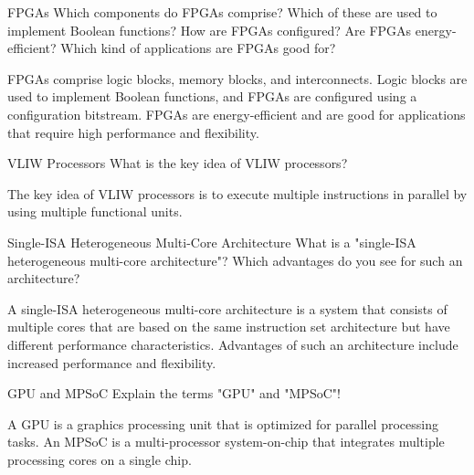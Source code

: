\documentclass{article}
\begin{document}
\begin{exercise}{FPGAs}
  Which components do FPGAs comprise? Which of these are used to implement Boolean functions? How are FPGAs configured? Are FPGAs energy-efficient? Which kind of applications are FPGAs good for?

  \begin{solution}
    FPGAs comprise logic blocks, memory blocks, and interconnects. Logic blocks are used to implement Boolean functions, and FPGAs are configured using a configuration bitstream. FPGAs are energy-efficient and are good for applications that require high performance and flexibility.
  \end{solution}
\end{exercise}

\begin{exercise}{VLIW Processors}
  What is the key idea of VLIW processors?

  \begin{solution}
    The key idea of VLIW processors is to execute multiple instructions in parallel by using multiple functional units.
  \end{solution}
\end{exercise}

\begin{exercise}{Single-ISA Heterogeneous Multi-Core Architecture}
  What is a "single-ISA heterogeneous multi-core architecture"? Which advantages do you see for such an architecture?

  \begin{solution}
    A single-ISA heterogeneous multi-core architecture is a system that consists of multiple cores that are based on the same instruction set architecture but have different performance characteristics. Advantages of such an architecture include increased performance and flexibility.
  \end{solution}
\end{exercise}

\begin{exercise}{GPU and MPSoC}
  Explain the terms "GPU" and "MPSoC"!

  \begin{solution}
    A GPU is a graphics processing unit that is optimized for parallel processing tasks. An MPSoC is a multi-processor system-on-chip that integrates multiple processing cores on a single chip.
  \end{solution}
\end{exercise}
\end{document}
